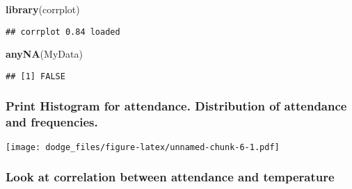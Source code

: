 \documentclass[]{article}
\newenvironment{Shaded}{\begin{snugshade}}{\end{snugshade}}
\newcommand{\DataTypeTok}[1]{\textcolor[rgb]{0.13,0.29,0.53}{#1}}
\newcommand{\KeywordTok}[1]{\textcolor[rgb]{0.13,0.29,0.53}{\textbf{#1}}}
\newcommand{\NormalTok}[1]{#1}
\newcommand{\OperatorTok}[1]{\textcolor[rgb]{0.81,0.36,0.00}{\textbf{#1}}}
\newcommand{\StringTok}[1]{\textcolor[rgb]{0.31,0.60,0.02}{#1}}
\begin{document}
\begin{Shaded}
\begin{Highlighting}[]
\KeywordTok{library}\NormalTok{(corrplot)}
\end{Highlighting}
\end{Shaded}

\begin{verbatim}
## corrplot 0.84 loaded
\end{verbatim}

\begin{Shaded}
\begin{Highlighting}[]
\KeywordTok{anyNA}\NormalTok{(MyData)}
\end{Highlighting}
\end{Shaded}

\begin{verbatim}
## [1] FALSE
\end{verbatim}

\hypertarget{print-histogram-for-attendance.-distribution-of-attendance-and-frequencies.}{%
\subsubsection{Print Histogram for attendance. Distribution of
attendance and
frequencies.}\label{print-histogram-for-attendance.-distribution-of-attendance-and-frequencies.}}

\begin{Shaded}
\end{Shaded}

\texttt{[image: dodge\_files/figure-latex/unnamed-chunk-6-1.pdf]}

\hypertarget{look-at-correlation-between-attendance-and-temperature}{%
\subsubsection{Look at correlation between attendance and
temperature}\label{look-at-correlation-between-attendance-and-temperature}}

\begin{Shaded}
\end{Shaded}
\end{document}
